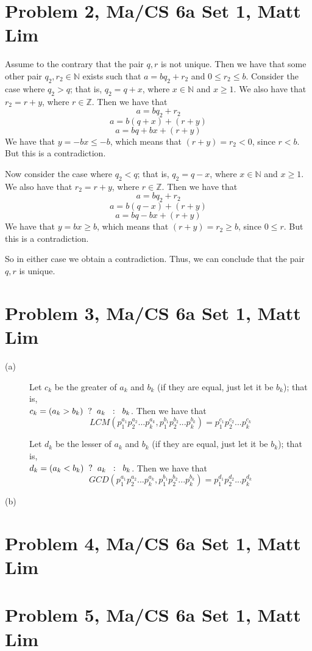 \documentclass{article}
\begin{document}
\section*{Problem 2, Ma/CS 6a Set 1, Matt Lim}
Assume to the contrary that the pair $q,r$ is not unique. Then we have that
some other pair $q_2, r_2 \in \mathbb{N}$ exists such that $a = bq_2 + r_2$
and $0 \leq r_2 \leq b$. Consider the case where $q_2 > q$; that is, $q_2 = q + x$,
where $x \in \mathbb{N}$ and $x \geq 1$. We also have that $r_2 = r + y$,
where $r \in \mathbb{Z}$. Then we have that
\[ a = bq_2 + r_2 \]
\[ a = b(q + x) + (r + y) \]
\[ a = bq + bx + (r + y) \]
We have that $y = -bx \leq -b$, which means that $(r + y) = r_2 < 0$, since $r < b$.
But this is a contradiction.

Now consider the case where $q_2 < q$; that is, $q_2 = q - x$, where $x \in \mathbb{N}$
and $x \geq 1$. We also have that $r_2 = r + y$, where $r \in \mathbb{Z}$. Then
we have that
\[ a = bq_2 + r_2 \]
\[ a = b(q - x) + (r + y) \]
\[ a = bq - bx + (r + y) \]
We have that $y = bx \geq b$, which means that $(r + y) = r_2 \geq b$, since
$0 \leq r$. But this is a contradiction.

So in either case we obtain a contradiction. Thus, we can conclude that the pair
$q,r$ is unique.
\newpage
\section*{Problem 3, Ma/CS 6a Set 1, Matt Lim}
\begin{description}
    \item[(a)]
        Let $c_k$ be the greater of $a_k$ and $b_k$ (if they are equal,
        just let it be $b_k$); that is, \\
        $c_k = (a_k > b_k) \hspace{2mm} ? \hspace{2mm} a_k \hspace{2mm} :
        \hspace{2mm} b_k$. Then we have that
        \[ LCM(p_1^{a_1}p_2^{a_2}...p_k^{a_k}, p_1^{b_1}p_2^{b_2}...
        p_k^{b_k}) = p_1^{c_1}p_2^{c_2}...p_k^{c_k}\]

        Let $d_k$ be the lesser of $a_k$ and $b_k$ (if they are equal,
        just let it be $b_k$); that is, \\
        $d_k = (a_k < b_k) \hspace{2mm} ? \hspace{2mm} a_k \hspace{2mm} :
        \hspace{2mm} b_k$. Then we have that
        \[ GCD(p_1^{a_1}p_2^{a_2}...p_k^{a_k}, p_1^{b_1}p_2^{b_2}...
        p_k^{b_k}) = p_1^{d_1}p_2^{d_2}...p_k^{d_k}\]
    \item[(b)]
\end{description}
\newpage
\section*{Problem 4, Ma/CS 6a Set 1, Matt Lim}
\newpage
\section*{Problem 5, Ma/CS 6a Set 1, Matt Lim}
\newpage
\end{document}
